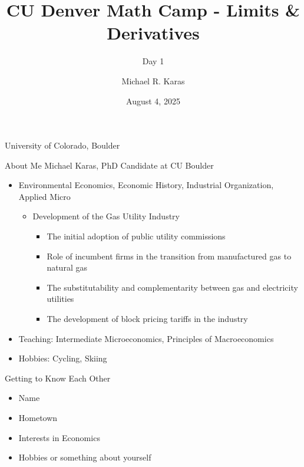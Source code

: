 \documentclass[aspectratio=169]{beamer}
\title{CU Denver Math Camp - Limits \& Derivatives}
\subtitle{Day 1}
\date{August 4, 2025}
\author{Michael R. Karas}
\begin{document}
\begin{frame}
\maketitle

{\footnotesize University of Colorado, Boulder}
\end{frame}

\begin{frame}{About Me}\label{main1}
Michael Karas, PhD Candidate at CU Boulder
\begin{itemize}
	\begin{itemize}
		\item michael.karas@colorado.edu
		\item Entering my 5th year, will be on job market Fall 2025
	\end{itemize}
	\item Environmental Economics, Economic History, Industrial Organization, Applied Micro
	\begin{itemize}
		\item Development of the Gas Utility Industry
			\begin{itemize}
				\item The initial adoption of public utility commissions
				\item Role of incumbent firms in the transition from manufactured gas to natural gas
				\item The substitutability and complementarity between gas and electricity utilities
				\item The development of block pricing tariffs in the industry
			\end{itemize}
	\end{itemize}
	\item Teaching: Intermediate Microeconomics, Principles of Macroeconomics
	\item Hobbies: Cycling, Skiing
\end{itemize}

\end{frame}


\begin{frame}{Getting to Know Each Other}\label{main1}
\begin{itemize}
	\item{Name}
	\item{Hometown}
	\item{Interests in Economics}
	\item{Hobbies or something about yourself}
\end{itemize}

\end{frame}
\end{document}
